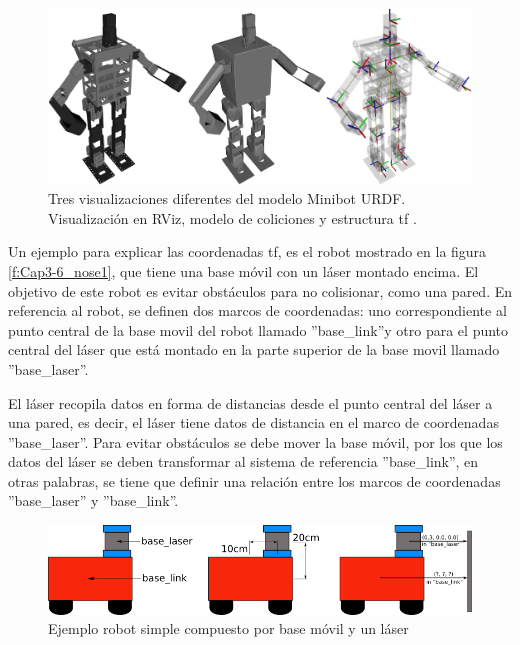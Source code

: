         \begin{figure}[htb]
            \centering
            \includegraphics[width=1.0\linewidth]{Main/Chapter3/Images3/3-6/ejemplo-multiples-frames-rviz.png}
            \caption{Tres visualizaciones diferentes del modelo Minibot URDF. Visualización en RViz, modelo de coliciones y estructura tf \cite{phdthesistfhuman}. }
            \label{f:Cap3-6_frames_rviz}
        \end{figure}
        
Un ejemplo para explicar las coordenadas tf, es el robot mostrado en la figura \eqref{f:Cap3-6_nose1}, que tiene una base móvil con un láser montado encima. El objetivo de este robot es evitar obstáculos para no colisionar, como una pared.
En referencia al robot, se definen dos marcos de coordenadas: uno correspondiente al punto central de la base movil del robot llamado ''base\_link''y otro para el punto central del láser que está montado en la parte superior de la base movil llamado ''base\_laser''. 

El láser recopila datos en forma de distancias desde el punto central del láser a una pared, es decir, el láser tiene datos de distancia en el marco de coordenadas ''base\_laser''. Para evitar obstáculos se debe mover la base móvil, por los que los datos del láser se deben transformar al sistema de referencia ''base\_link'', en otras palabras,  se tiene que definir una relación entre los marcos de coordenadas ''base\_laser'' y ''base\_link''.

 \newpage
 
        \begin{figure}[htb]
            \centering
            \includegraphics[width=1.0\linewidth]{Main/Chapter3/Images3/simple_robot.png}
            \caption{Ejemplo robot simple compuesto por base móvil y un láser}
            \label{f:Cap3-6_nose1}
        \end{figure}    

